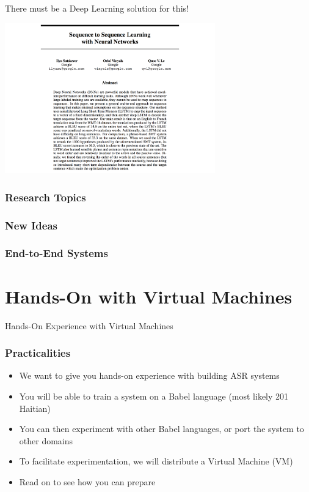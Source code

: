 \begin{frame}{There must be a Deep Learning solution for this!}
  \begin{center}
    \includegraphics[height=65mm]{figures/s2s}
  \end{center}
\end{frame}

\begin{frame}
  \frametitle{Research Topics}
\end{frame}

\begin{frame}
  \frametitle{New Ideas}
\end{frame}

\begin{frame}
  \frametitle{End-to-End Systems}
\end{frame}

\section{Hands-On with Virtual Machines}

\begin{frame}
  \begin{center}
    {\color{Maroon}\Huge Hands-On Experience with Virtual Machines\par}
  \end{center}
\end{frame}

\begin{frame}
  \frametitle{Practicalities}
  \begin{itemize}
  \item We want to give you hands-on experience with building ASR systems
  \item You will be able to train a system on a Babel language (most likely 201 Haitian)
  \item You can then experiment with other Babel languages, or port the system to other domains
  \item To facilitate experimentation, we will distribute a Virtual Machine (VM)
  \item {\color{Maroon}Read on to see how you can prepare}
  \end{itemize}
\end{frame}

